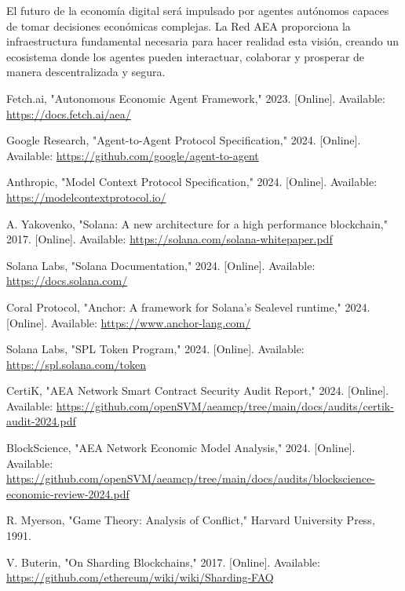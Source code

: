 \documentclass[12pt,a4paper]{article}
\begin{document}
El futuro de la economía digital será impulsado por agentes autónomos capaces de tomar decisiones económicas complejas. La Red AEA proporciona la infraestructura fundamental necesaria para hacer realidad esta visión, creando un ecosistema donde los agentes pueden interactuar, colaborar y prosperar de manera descentralizada y segura.

\begin{thebibliography}{99}

Fetch.ai, "Autonomous Economic Agent Framework," 2023. [Online]. Available: \url{https://docs.fetch.ai/aea/}

Google Research, "Agent-to-Agent Protocol Specification," 2024. [Online]. Available: \url{https://github.com/google/agent-to-agent}

Anthropic, "Model Context Protocol Specification," 2024. [Online]. Available: \url{https://modelcontextprotocol.io/}

A. Yakovenko, "Solana: A new architecture for a high performance blockchain," 2017. [Online]. Available: \url{https://solana.com/solana-whitepaper.pdf}

Solana Labs, "Solana Documentation," 2024. [Online]. Available: \url{https://docs.solana.com/}

Coral Protocol, "Anchor: A framework for Solana's Sealevel runtime," 2024. [Online]. Available: \url{https://www.anchor-lang.com/}

Solana Labs, "SPL Token Program," 2024. [Online]. Available: \url{https://spl.solana.com/token}

CertiK, "AEA Network Smart Contract Security Audit Report," 2024. [Online]. Available: \url{https://github.com/openSVM/aeamcp/tree/main/docs/audits/certik-audit-2024.pdf}

BlockScience, "AEA Network Economic Model Analysis," 2024. [Online]. Available: \url{https://github.com/openSVM/aeamcp/tree/main/docs/audits/blockscience-economic-review-2024.pdf}

R. Myerson, "Game Theory: Analysis of Conflict," Harvard University Press, 1991.

V. Buterin, "On Sharding Blockchains," 2017. [Online]. Available: \url{https://github.com/ethereum/wiki/wiki/Sharding-FAQ}


\end{thebibliography}
\end{document}
